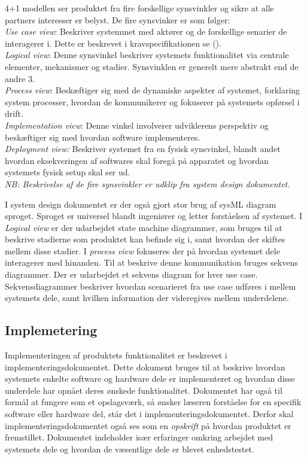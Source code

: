 	4+1 modellen ser produktet fra fire forskellige synsvinkler og sikre at alle partners interesser er belyst. De fire synsvinker er som følger: 
	\\ \textit{Use case view}: Beskriver systemmet med aktører og de forskellige senarier de interagerer i. Dette er beskrevet i kravspecifikationen se ().\\
	\textit{Logical view}: Denne synsvinkel beskriver systemets funktionalitet via centrale elementer, mekanismer og stadier. Synsvinklen er generelt mere abstrakt end de andre 3. \\
	\textit{Process view}: Beskæftiger sig med de dynamiske aspekter af systemet, forklaring system processer, hvordan de kommunikerer og fokuserer på systemets opførsel i drift. \\
	\textit{Implementation view}: Denne vinkel involverer udviklerens perspektiv og beskæftiger sig med hvordan software implementeres. \\
	\textit{Deployment view:} Beskriver systemet fra en fysisk synsvinkel, blandt andet hvordan eksekveringen af softwares skal foregå på apparatet og hvordan systemets fysisk setup skal ser ud. \\
	\textit{NB: Beskrivelse af de fire synsvinkler er udklip fra system design dokumentet.} 
	
	I system design dokumentet er der også gjort stor brug af sysML diagram sproget. Sproget er universel blandt ingeniører og letter forståelsen af systemet. I \textit{Logical view} er der udarbejdet state machine diagrammer, som bruges til at beskrive stadierne som produktet kan befinde sig i, samt hvordan der skiftes mellem disse stadier. I \textit{process view} fokuseres der på hvordan systemet dele interagerer med hinanden. Til at beskrive denne kommunikation bruges sekvens diagrammer. Der er udarbejdet et sekvens diagram for hver use case. Sekvensdiagrammer beskriver hvordan scenarieret fra use case udføres i mellem systemets dele, samt hvilken information der videregives mellem underdelene. 
	
	\subsection{Implemetering} \label{title:implementering}
	Implementeringen af produktets funktionalitet er beskrevet i implementeringsdokumentet. Dette dokument bruges til at beskrive hvordan systemets enkelte software og hardware dele er implementeret og hvordan disse underdele har opnået deres ønskede funktionalitet. Dokumentet har også til formål at fungere som et opslagsværk, så ønsker læseren forståelse for en specifik software eller hardware del, står det i implementeringsdokumentet. Derfor skal implementeringsdokumentet også ses som en \textit{opskrift} på hvordan produktet er fremstillet. Dokumentet indeholder især erfaringer omkring arbejdet med systemets dele og hvordan de væsentlige dele er blevet enhedstestet. 

